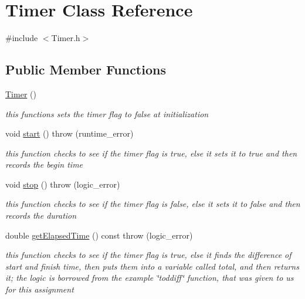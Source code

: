 \hypertarget{class_timer}{}\section{Timer Class Reference}
\label{class_timer}


{\ttfamily \#include $<$Timer.\+h$>$}

\subsection*{Public Member Functions}
\begin{DoxyCompactItemize}
\item 
\hyperlink{class_timer_a5f16e8da27d2a5a5242dead46de05d97}{Timer} ()
\begin{DoxyCompactList}\small\item\em this functions sets the timer flag to false at initialization \end{DoxyCompactList}\item 
void \hyperlink{class_timer_a3a8b5272198d029779dc9302a54305a8}{start} ()  throw (runtime\+\_\+error)
\begin{DoxyCompactList}\small\item\em this function checks to see if the timer flag is true, else it sets it to true and then records the begin time \end{DoxyCompactList}\item 
void \hyperlink{class_timer_a63f0eb44b27402196590a03781515dba}{stop} ()  throw (logic\+\_\+error)
\begin{DoxyCompactList}\small\item\em this function checks to see if the timer flag is false, else it sets it to false and then records the duration \end{DoxyCompactList}\item 
double \hyperlink{class_timer_ad306e18f8d8a0296e001683f92d7f86e}{get\+Elapsed\+Time} () const   throw (logic\+\_\+error)
\begin{DoxyCompactList}\small\item\em this function checks to see if the timer flag is true, else it finds the difference of start and finish time, then puts them into a variable called total, and then returns it; the logic is borrowed from the example \char`\"{}toddiff\char`\"{} function, that was given to us for this assignment \end{DoxyCompactList}\end{DoxyCompactItemize}


